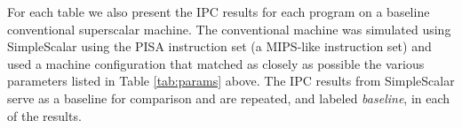 For each table we also present the IPC results for each program
on a baseline
conventional superscalar machine.  The conventional machine was
simulated using SimpleScalar \cite{Austin97} using the PISA
instruction set (a MIPS-like instruction set) and 
used a machine configuration that
matched as closely as possible the various parameters listed
in Table \ref{tab:params} above.  
The IPC results from SimpleScalar
serve as a baseline for comparison and are repeated, and
labeled \textit{baseline}, in each of the results.

